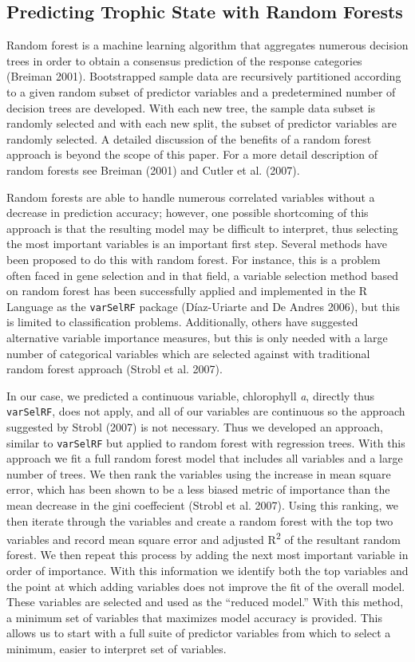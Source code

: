 \documentclass[11pt,]{article}
\begin{document}
\subsection{Predicting Trophic State with Random
Forests}\label{predicting-trophic-state-with-random-forests}

Random forest is a machine learning algorithm that aggregates numerous
decision trees in order to obtain a consensus prediction of the response
categories (Breiman 2001). Bootstrapped sample data are recursively
partitioned according to a given random subset of predictor variables
and a predetermined number of decision trees are developed. With each
new tree, the sample data subset is randomly selected and with each new
split, the subset of predictor variables are randomly selected. A
detailed discussion of the benefits of a random forest approach is
beyond the scope of this paper. For a more detail description of random
forests see Breiman (2001) and Cutler et al. (2007).

Random forests are able to handle numerous correlated variables without
a decrease in prediction accuracy; however, one possible shortcoming of
this approach is that the resulting model may be difficult to interpret,
thus selecting the most important variables is an important first step.
Several methods have been proposed to do this with random forest. For
instance, this is a problem often faced in gene selection and in that
field, a variable selection method based on random forest has been
successfully applied and implemented in the R Language as the
\texttt{varSelRF} package (D{í}az-Uriarte and De Andres 2006), but this
is limited to classification problems. Additionally, others have
suggested alternative variable importance measures, but this is only
needed with a large number of categorical variables which are selected
against with traditional random forest approach (Strobl et al. 2007).

In our case, we predicted a continuous variable, chlorophyll \emph{a},
directly thus \texttt{varSelRF}, does not apply, and all of our
variables are continuous so the approach suggested by Strobl (2007) is
not necessary. Thus we developed an approach, similar to
\texttt{varSelRF} but applied to random forest with regression trees.
With this approach we fit a full random forest model that includes all
variables and a large number of trees. We then rank the variables using
the increase in mean square error, which has been shown to be a less
biased metric of importance than the mean decrease in the gini
coeffecient (Strobl et al. 2007). Using this ranking, we then iterate
through the variables and create a random forest with the top two
variables and record mean square error and adjusted R\textsuperscript{2}
of the resultant random forest. We then repeat this process by adding
the next most important variable in order of importance. With this
information we identify both the top variables and the point at which
adding variables does not improve the fit of the overall model. These
variables are selected and used as the ``reduced model.'' With this
method, a minimum set of variables that maximizes model accuracy is
provided. This allows us to start with a full suite of predictor
variables from which to select a minimum, easier to interpret set of
variables.
\end{document}
